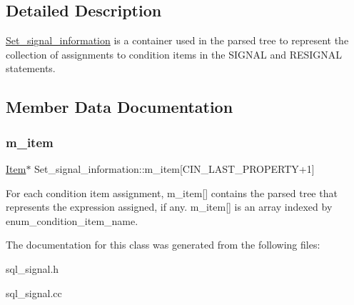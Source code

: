 \subsection{Detailed Description}
\mbox{\hyperlink{classSet__signal__information}{Set\+\_\+signal\+\_\+information}} is a container used in the parsed tree to represent the collection of assignments to condition items in the S\+I\+G\+N\+AL and R\+E\+S\+I\+G\+N\+AL statements. 

\subsection{Member Data Documentation}
\mbox{\label{classSet__signal__information_a524ccdde56b465f50940abd11dbebcbf}} 
\subsubsection{\texorpdfstring{m\+\_\+item}{m\_item}}
{\footnotesize\ttfamily \mbox{\hyperlink{classItem}{Item}}$\ast$ Set\+\_\+signal\+\_\+information\+::m\+\_\+item\mbox{[}C\+I\+N\+\_\+\+L\+A\+S\+T\+\_\+\+P\+R\+O\+P\+E\+R\+TY+1\mbox{]}}

For each condition item assignment, m\+\_\+item\mbox{[}\mbox{]} contains the parsed tree that represents the expression assigned, if any. m\+\_\+item\mbox{[}\mbox{]} is an array indexed by enum\+\_\+condition\+\_\+item\+\_\+name. 

The documentation for this class was generated from the following files\+:\begin{DoxyCompactItemize}
\item 
sql\+\_\+signal.\+h\item 
sql\+\_\+signal.\+cc\end{DoxyCompactItemize}
